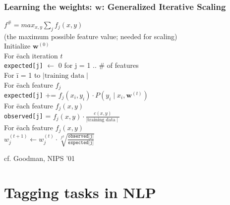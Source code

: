 \begin{frame}
\frametitle{Learning the weights: $\textbf{w}$: Generalized Iterative
  Scaling}
\begin{tabbing}
$f^\# = max_{x,y} \sum_{j} f_j(x, y)$ \\
(the maximum possible feature value; needed for scaling) \pause \\
Initialize $\textbf{w}^{(0)}$ \pause \\
For \= each iteration $t$ \\
\> \texttt{expected[j]} $\leftarrow$ 0 for j = 1 .. \# of features \pause \\
\> For \= i = 1 to $\mid \textrm{training data} \mid$ \\
\>     \> For \= each feature $f_j$ \\
\>     \>     \> \texttt{expected[j]} += $f_j(x_i, y_i) \cdot P(y_i \mid x_i, \textbf{w}^{(t)})$ \pause \\
\> For \= each feature $f_j(x,y)$ \\
\>     \> \texttt{observed[j]} = $f_j(x, y) \cdot \frac{c(x,y)}{\mid \textrm{training data} \mid}$ \pause \\ 
\> For \= each feature $f_j(x,y)$ \\
\>     \> $w_j^{(t+1)} \leftarrow w_j^{(t)} \cdot \sqrt[f^\#]{\frac{\texttt{observed[j]}}{\texttt{expected[j]}}}$ 
\end{tabbing}
\par\noindent
\small{cf. Goodman, NIPS '01}
\end{frame} 


\section{Tagging tasks in NLP}
\frame{\tableofcontents[currentsection]}
\newcommand{\postag}[1]{{\color{red}/#1}}
\newcommand{\nertag}[1]{{\color{blue}/#1}}

